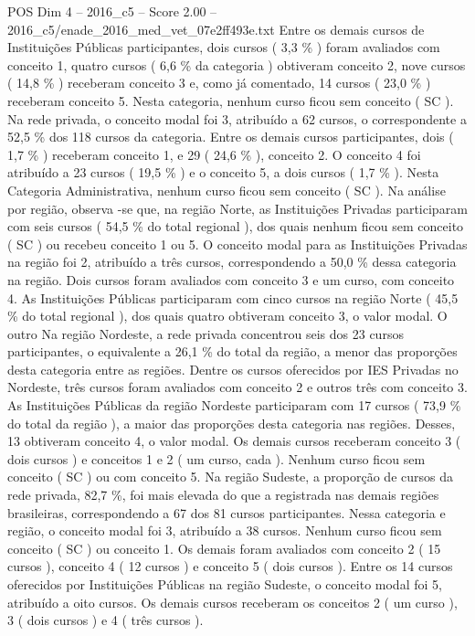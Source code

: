 \begin{textsample}{POS Dim 4 – 2016\_c5 – Score 2.00 – 2016\_c5/enade\_2016\_med\_vet\_07e2ff493e.txt}
Entre os demais cursos de Instituições Públicas participantes, dois cursos ( 3,3 \% ) foram avaliados com conceito 1, quatro cursos ( 6,6 \% da categoria ) obtiveram conceito 2, nove cursos ( 14,8 \% ) receberam conceito 3 e, como já comentado, 14 cursos ( 23,0 \% ) receberam conceito 5.
Nesta categoria, nenhum curso ficou sem conceito ( SC ).
Na rede privada, o conceito modal foi 3, atribuído a 62 cursos, o correspondente a 52,5 \% dos 118 cursos da categoria.
Entre os demais cursos participantes, dois ( 1,7 \% ) receberam conceito 1, e 29 ( 24,6 \% ), conceito 2.
O conceito 4 foi atribuído a 23 cursos ( 19,5 \% ) e o conceito 5, a dois cursos ( 1,7 \% ).
Nesta Categoria Administrativa, nenhum curso ficou sem conceito ( SC ).
Na análise por região, observa -se que, na região Norte, as Instituições Privadas participaram com seis cursos ( 54,5 \% do total regional ), dos quais nenhum ficou sem conceito ( SC ) ou recebeu conceito 1 ou 5.
O conceito modal para as Instituições Privadas na região foi 2, atribuído a três cursos, correspondendo a 50,0 \% dessa categoria na região.
Dois cursos foram avaliados com conceito 3 e um curso, com conceito 4.
As Instituições Públicas participaram com cinco cursos na região Norte ( 45,5 \% do total regional ), dos quais quatro obtiveram conceito 3, o valor modal.
O outro Na região Nordeste, a rede privada concentrou seis dos 23 cursos participantes, o equivalente a 26,1 \% do total da região, a menor das proporções desta categoria entre as regiões.
Dentre os cursos oferecidos por IES Privadas no Nordeste, três cursos foram avaliados com conceito 2 e outros três com conceito 3.
As Instituições Públicas da região Nordeste participaram com 17 cursos ( 73,9 \% do total da região ), a maior das proporções desta categoria nas regiões.
Desses, 13 obtiveram conceito 4, o valor modal.
Os demais cursos receberam conceito 3 ( dois cursos ) e conceitos 1 e 2 ( um curso, cada ).
Nenhum curso ficou sem conceito ( SC ) ou com conceito 5.
Na região Sudeste, a proporção de cursos da rede privada, 82,7 \%, foi mais elevada do que a registrada nas demais regiões brasileiras, correspondendo a 67 dos 81 cursos participantes.
Nessa categoria e região, o conceito modal foi 3, atribuído a 38 cursos.
Nenhum curso ficou sem conceito ( SC ) ou conceito 1.
Os demais foram avaliados com conceito 2 ( 15 cursos ), conceito 4 ( 12 cursos ) e conceito 5 ( dois cursos ).
Entre os 14 cursos oferecidos por Instituições Públicas na região Sudeste, o conceito modal foi 5, atribuído a oito cursos.
Os demais cursos receberam os conceitos 2 ( um curso ), 3 ( dois cursos ) e 4 ( três cursos ).

\end{textsample}
